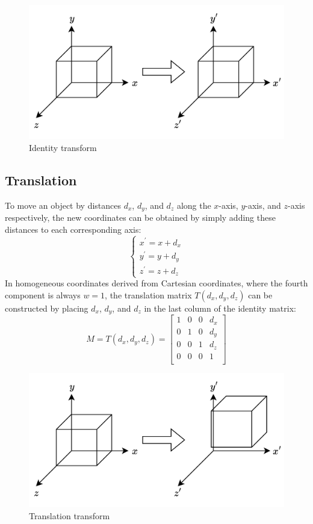 \begin{figure}[H]
    \centering
    \includegraphics[width=0.65\linewidth]{images/identity.png}
    \caption{Identity transform}
\end{figure}

\subsection{Translation}
To move an object by distances $d_x$, $d_y$, and $d_z$ along the $x$-axis, $y$-axis, and $z$-axis respectively, the new coordinates can be obtained by simply adding these distances to each corresponding axis:
\[\begin{cases}
    x^\prime=x+d_x \\ 
    y^\prime=y+d_y \\ 
    z^\prime=z+d_z 
\end{cases}\]
In homogeneous coordinates derived from Cartesian coordinates, where the fourth component is always $w=1$, the translation matrix $T(d_x, d_y, d_z)$ can be constructed by placing $d_x$, $d_y$, and $d_z$ in the last column of the identity matrix:
\[M=T(d_x , d_y , d_z)=\begin{bmatrix}
    1 & 0 & 0 & d_x \\
    0 & 1 & 0 & d_y \\
    0 & 0 & 1 & d_z \\
    0 & 0 & 0 & 1   \\
\end{bmatrix}\]

\begin{figure}[H]
    \centering
    \includegraphics[width=0.65\linewidth]{images/traslation.png}
    \caption{Translation transform}
\end{figure}

